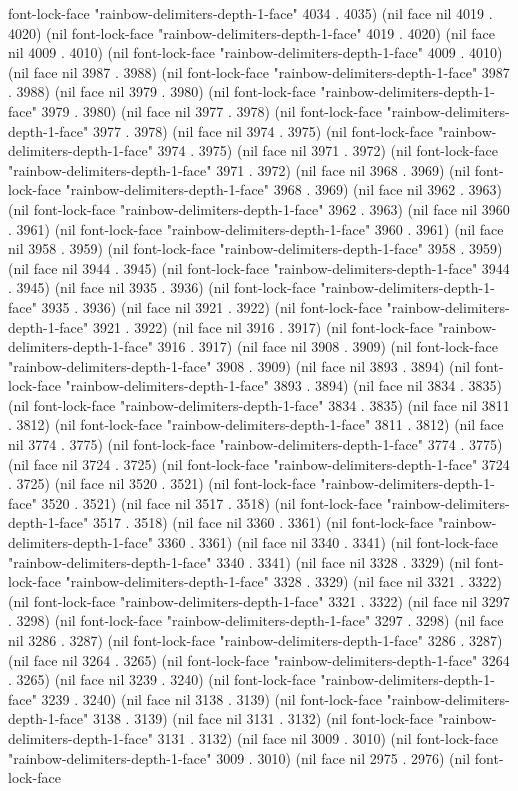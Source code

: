 font-lock-face "rainbow-delimiters-depth-1-face" 4034 . 4035) (nil face nil 4019 . 4020) (nil font-lock-face "rainbow-delimiters-depth-1-face" 4019 . 4020) (nil face nil 4009 . 4010) (nil font-lock-face "rainbow-delimiters-depth-1-face" 4009 . 4010) (nil face nil 3987 . 3988) (nil font-lock-face "rainbow-delimiters-depth-1-face" 3987 . 3988) (nil face nil 3979 . 3980) (nil font-lock-face "rainbow-delimiters-depth-1-face" 3979 . 3980) (nil face nil 3977 . 3978) (nil font-lock-face "rainbow-delimiters-depth-1-face" 3977 . 3978) (nil face nil 3974 . 3975) (nil font-lock-face "rainbow-delimiters-depth-1-face" 3974 . 3975) (nil face nil 3971 . 3972) (nil font-lock-face "rainbow-delimiters-depth-1-face" 3971 . 3972) (nil face nil 3968 . 3969) (nil font-lock-face "rainbow-delimiters-depth-1-face" 3968 . 3969) (nil face nil 3962 . 3963) (nil font-lock-face "rainbow-delimiters-depth-1-face" 3962 . 3963) (nil face nil 3960 . 3961) (nil font-lock-face "rainbow-delimiters-depth-1-face" 3960 . 3961) (nil face nil 3958 . 3959) (nil font-lock-face "rainbow-delimiters-depth-1-face" 3958 . 3959) (nil face nil 3944 . 3945) (nil font-lock-face "rainbow-delimiters-depth-1-face" 3944 . 3945) (nil face nil 3935 . 3936) (nil font-lock-face "rainbow-delimiters-depth-1-face" 3935 . 3936) (nil face nil 3921 . 3922) (nil font-lock-face "rainbow-delimiters-depth-1-face" 3921 . 3922) (nil face nil 3916 . 3917) (nil font-lock-face "rainbow-delimiters-depth-1-face" 3916 . 3917) (nil face nil 3908 . 3909) (nil font-lock-face "rainbow-delimiters-depth-1-face" 3908 . 3909) (nil face nil 3893 . 3894) (nil font-lock-face "rainbow-delimiters-depth-1-face" 3893 . 3894) (nil face nil 3834 . 3835) (nil font-lock-face "rainbow-delimiters-depth-1-face" 3834 . 3835) (nil face nil 3811 . 3812) (nil font-lock-face "rainbow-delimiters-depth-1-face" 3811 . 3812) (nil face nil 3774 . 3775) (nil font-lock-face "rainbow-delimiters-depth-1-face" 3774 . 3775) (nil face nil 3724 . 3725) (nil font-lock-face "rainbow-delimiters-depth-1-face" 3724 . 3725) (nil face nil 3520 . 3521) (nil font-lock-face "rainbow-delimiters-depth-1-face" 3520 . 3521) (nil face nil 3517 . 3518) (nil font-lock-face "rainbow-delimiters-depth-1-face" 3517 . 3518) (nil face nil 3360 . 3361) (nil font-lock-face "rainbow-delimiters-depth-1-face" 3360 . 3361) (nil face nil 3340 . 3341) (nil font-lock-face "rainbow-delimiters-depth-1-face" 3340 . 3341) (nil face nil 3328 . 3329) (nil font-lock-face "rainbow-delimiters-depth-1-face" 3328 . 3329) (nil face nil 3321 . 3322) (nil font-lock-face "rainbow-delimiters-depth-1-face" 3321 . 3322) (nil face nil 3297 . 3298) (nil font-lock-face "rainbow-delimiters-depth-1-face" 3297 . 3298) (nil face nil 3286 . 3287) (nil font-lock-face "rainbow-delimiters-depth-1-face" 3286 . 3287) (nil face nil 3264 . 3265) (nil font-lock-face "rainbow-delimiters-depth-1-face" 3264 . 3265) (nil face nil 3239 . 3240) (nil font-lock-face "rainbow-delimiters-depth-1-face" 3239 . 3240) (nil face nil 3138 . 3139) (nil font-lock-face "rainbow-delimiters-depth-1-face" 3138 . 3139) (nil face nil 3131 . 3132) (nil font-lock-face "rainbow-delimiters-depth-1-face" 3131 . 3132) (nil face nil 3009 . 3010) (nil font-lock-face "rainbow-delimiters-depth-1-face" 3009 . 3010) (nil face nil 2975 . 2976) (nil font-lock-face 